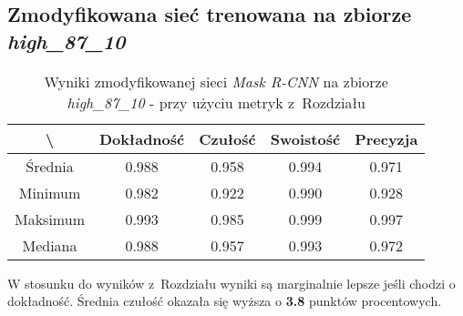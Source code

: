 \subsection{Zmodyfikowana sieć trenowana na zbiorze \textit{high\_87\_10}}
\label{sec:results_high_modified}

\begin{table}[H]
	\centering
	\caption{Wyniki zmodyfikowanej sieci \textit{Mask R-CNN} na zbiorze \textit{high\_87\_10} - przy użyciu metryk z~Rozdziału }
	\vspace{6pt}
	{\footnotesize
		\begin{tabular}{|c|c|c|c|c|}
      \hline \textbackslash & Dokładność & Czułość & Swoistość & Precyzja \\
      \hline Średnia & 0.988 & 0.958 & 0.994 & 0.971 \\
      \hline Minimum & 0.982 & 0.922 & 0.990 & 0.928 \\
      \hline Maksimum & 0.993 & 0.985 & 0.999 & 0.997 \\
      \hline Mediana & 0.988 & 0.957 & 0.993 & 0.972 \\
      \hline
		\end{tabular}
	}
  \vspace{0pt}
  \label{Tab:high_modified_calculated}
\end{table}

W stosunku do wyników z~Rozdziału  wyniki są marginalnie lepsze jeśli chodzi o dokładność. Średnia czułość okazała się wyższa o \textbf{3.8} punktów procentowych.
